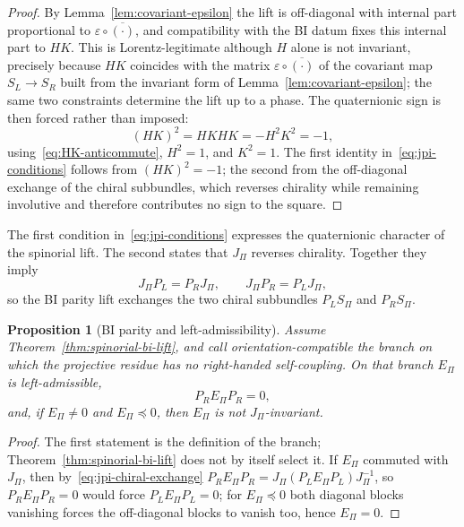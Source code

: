 \documentclass[11pt,a4paper]{article}
\newtheorem{proposition}[theorem]{Proposition}
\theoremstyle{definition}
\theoremstyle{remark}
\begin{document}
    \begin{proof}
      By Lemma~\ref{lem:covariant-epsilon} the lift is off-diagonal with internal part proportional
      to $\varepsilon \circ \overline{(\cdot)}$, and compatibility with the BI datum fixes this
      internal part to $H K$.
      This is Lorentz-legitimate although $H$ alone is not invariant, precisely because $H K$
      coincides with the matrix $\varepsilon \circ \overline{(\cdot)}$ of the covariant map
      $S_L \to S_R$ built from the invariant form of Lemma~\ref{lem:covariant-epsilon}; the same two
      constraints determine the lift up to a phase.
      The quaternionic sign is then forced rather than imposed:
      \[
        (H K)^2 = H K H K = - H^2 K^2 = -1 ,
      \]
      using~\eqref{eq:HK-anticommute}, $H^2 = 1$, and $K^2 = 1$.
      The first identity in~\eqref{eq:jpi-conditions} follows from $(H K)^2 = -1$; the second from
      the off-diagonal exchange of the chiral subbundles, which reverses chirality while remaining
      involutive and therefore contributes no sign to the square.
    \end{proof}

    The first condition in~\eqref{eq:jpi-conditions} expresses the quaternionic
    character of the spinorial lift.
    The second states that $J_\Pi$ reverses chirality.
    Together they imply
    \begin{equation}
      \label{eq:jpi-chiral-exchange}
      J_\Pi P_L = P_R J_\Pi,
      \qquad
      J_\Pi P_R = P_L J_\Pi,
    \end{equation}
    so the BI parity lift exchanges the two chiral subbundles $P_L S_\Pi$ and
    $P_R S_\Pi$.

    \begin{proposition}[BI parity and left-admissibility]
      \label{prop:bi-left-admissibility}
      Assume Theorem~\ref{thm:spinorial-bi-lift}, and call orientation-compatible the branch on which
      the projective residue has no right-handed self-coupling.
      On that branch $E_\Pi$ is left-admissible,
      \[
        P_R E_\Pi P_R = 0 ,
      \]
      and, if $E_\Pi \neq 0$ and $E_\Pi \preceq 0$, then $E_\Pi$ is not $J_\Pi$-invariant.
    \end{proposition}

    \begin{proof}
      The first statement is the definition of the branch; Theorem~\ref{thm:spinorial-bi-lift} does not
      by itself select it.
      If $E_\Pi$ commuted with $J_\Pi$, then by~\eqref{eq:jpi-chiral-exchange}
      $P_R E_\Pi P_R = J_\Pi (P_L E_\Pi P_L) J_\Pi^{-1}$, so $P_R E_\Pi P_R = 0$ would force
      $P_L E_\Pi P_L = 0$; for $E_\Pi \preceq 0$ both diagonal blocks vanishing forces the off-diagonal
      blocks to vanish too, hence $E_\Pi = 0$.
    \end{proof}
\end{document}
